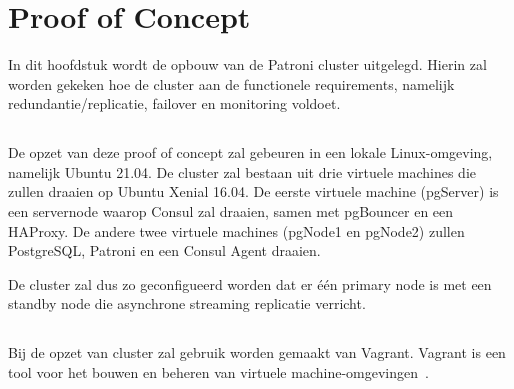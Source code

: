 
\chapter{Proof of Concept}
\label{ch:Proof of Concept}

In dit hoofdstuk wordt de opbouw van de Patroni cluster uitgelegd. Hierin zal worden gekeken hoe de cluster aan de functionele requirements, namelijk redundantie/replicatie, failover en monitoring voldoet.

\section{}
\label{sec:Omgeving}
De opzet van deze proof of concept zal gebeuren in een lokale Linux-omgeving, namelijk Ubuntu 21.04.
De cluster zal bestaan uit drie virtuele machines die zullen draaien op Ubuntu Xenial 16.04. De eerste virtuele machine (pgServer) is een servernode waarop Consul zal draaien, samen met pgBouncer en een HAProxy. De andere twee virtuele machines (pgNode1 en pgNode2) zullen PostgreSQL, Patroni en een Consul Agent draaien.

De cluster zal dus zo geconfigueerd worden dat er één primary node is met een standby node die asynchrone streaming replicatie verricht.

\section{}
\label{sec:Prerequisites}

\subsection{}
\label{subsec:Vagrant}
Bij de opzet van cluster zal gebruik worden gemaakt van Vagrant. Vagrant is een tool voor het bouwen en beheren van virtuele machine-omgevingen~\autocite{Kalow2020}.



